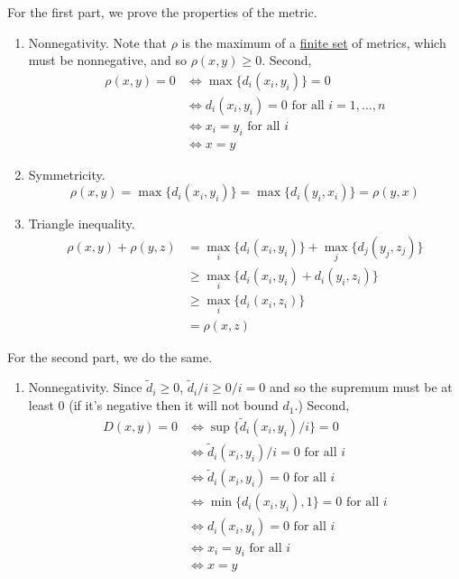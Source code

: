   \begin{solution}
    For the first part, we prove the properties of the metric. 
    \begin{enumerate}
      \item Nonnegativity. Note that $\rho$ is the maximum of a \hyperref[st-def:finite-set]{finite set} of metrics, which must be nonnegative, and so $\rho(x, y) \geq 0$. Second,  
      \begin{align}
        \rho(x, y) = 0 & \iff \max\{d_i (x_i, y_i)\} = 0 \\
                       & \iff d_i (x_i, y_i) = 0 \text{ for all } i = 1, \ldots, n  \\
                       & \iff x_i = y_i \text{ for all } i \\
                       & \iff x = y
      \end{align}

      \item Symmetricity. 
      \begin{equation}
        \rho(x, y) = \max\{d_i (x_i, y_i)\} = \max\{d_i (y_i, x_i)\} = \rho(y, x)
      \end{equation}

      \item Triangle inequality. 
      \begin{align}
        \rho(x, y) + \rho(y, z) & = \max_i \{d_i (x_i, y_i)\} + \max_j \{d_j (y_j, z_j)\} \\
                                & \geq \max_i \{ d_i (x_i, y_i) + d_i (y_i, z_i) \} \\
                                & \geq \max_i \{ d_i (x_i, z_i) \} \\
                                & = \rho(x, z)
      \end{align}
    \end{enumerate} 
    
    For the second part, we do the same. 
    \begin{enumerate}
      \item Nonnegativity. Since $\tilde{d}_i \geq 0$, $\tilde{d}_i / i \geq 0/i = 0$ and so the supremum must be at least $0$ (if it's negative then it will not bound $d_1$.) Second, 
        \begin{align}
          D(x, y) = 0 & \iff \sup\{\tilde{d}_i (x_i, y_i) / i \} = 0 \\
                      & \iff \tilde{d}_i (x_i, y_i) / i = 0 \text{ for all } i \\
                      & \iff \tilde{d}_i (x_i, y_i) = 0 \text{ for all } i \\
                      & \iff \min\{d_i (x_i, y_i), 1 \} = 0 \text{ for all } i \\ 
                      & \iff d_i (x_i, y_i) = 0 \text{ for all } i \\
                      & \iff x_i = y_i \text{ for all } i \\
                      & \iff x = y
        \end{align}


\end{enumerate}
\end{solution}
